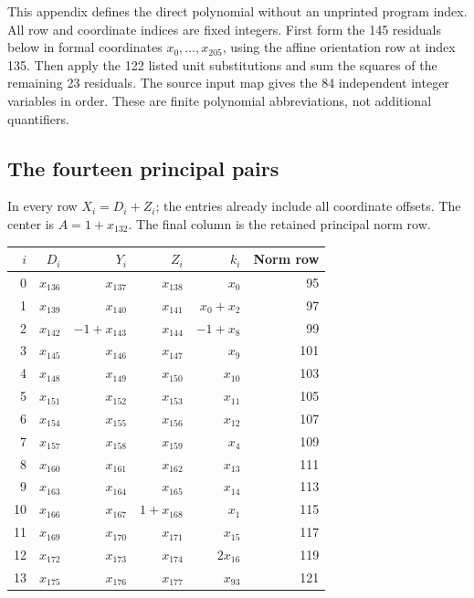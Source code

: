 This appendix defines the direct polynomial without an unprinted program index. All row and coordinate indices are fixed integers. First form the 145 residuals below in formal coordinates $x_0,\ldots,x_{205}$, using the affine orientation row at index 135. Then apply the 122 listed unit substitutions and sum the squares of the remaining 23 residuals. The source input map gives the 84 independent integer variables in order. These are finite polynomial abbreviations, not additional quantifiers.

\subsection{The fourteen principal pairs}
In every row $X_i=D_i+Z_i$; the entries already include all coordinate offsets. The center is $A=1+x_{132}$. The final column is the retained principal norm row.
\begin{center}\small\begin{tabular}{rrrrrr}\toprule
$i$&$D_i$&$Y_i$&$Z_i$&$k_i$&Norm row\\\midrule
0&$x_{136}$&$x_{137}$&$x_{138}$&$x_{0}$&95\\
1&$x_{139}$&$x_{140}$&$x_{141}$&$x_{0}+x_{2}$&97\\
2&$x_{142}$&$-1+x_{143}$&$x_{144}$&$-1+x_{8}$&99\\
3&$x_{145}$&$x_{146}$&$x_{147}$&$x_{9}$&101\\
4&$x_{148}$&$x_{149}$&$x_{150}$&$x_{10}$&103\\
5&$x_{151}$&$x_{152}$&$x_{153}$&$x_{11}$&105\\
6&$x_{154}$&$x_{155}$&$x_{156}$&$x_{12}$&107\\
7&$x_{157}$&$x_{158}$&$x_{159}$&$x_{4}$&109\\
8&$x_{160}$&$x_{161}$&$x_{162}$&$x_{13}$&111\\
9&$x_{163}$&$x_{164}$&$x_{165}$&$x_{14}$&113\\
10&$x_{166}$&$x_{167}$&$1+x_{168}$&$x_{1}$&115\\
11&$x_{169}$&$x_{170}$&$x_{171}$&$x_{15}$&117\\
12&$x_{172}$&$x_{173}$&$x_{174}$&$2x_{16}$&119\\
13&$x_{175}$&$x_{176}$&$x_{177}$&$x_{93}$&121\\
\bottomrule\end{tabular}\end{center}
